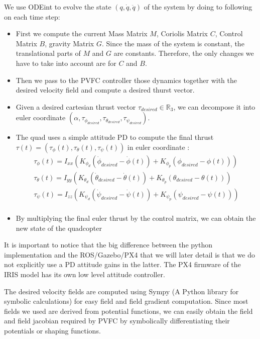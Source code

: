 We use ODEint to evolve the state $(q,\dot{q}, \ddot{q})$ of the system by doing to following on each time step: 
\begin{itemize}
    \item First we compute the current Mass Matrix $M$, Coriolis Matrix $C$, Control Matrix $B$, gravity Matrix $G$. Since the mass of the system is constant, the translational parts of $M$ and $G$ are constants.
    Therefore, the only changes we have to take into account are for $C$ and $B$.
    \item Then we pass to the PVFC controller those dynamics together with the desired velocity field and compute a desired thurst vector.
    \item Given a desired cartesian thrust vector $\tau_{desired} \in \mathbb{R}_3$, we can decompose it into euler coordinate $(\alpha, \tau_{\phi_{desired}}, \tau_{\theta_{desired}}, \tau_{\psi_{desired}})$. 
    \item The quad uses a simple attitude PD to compute the final thrust $\tau(t) = (\tau_{{\phi}}(t), \tau_{{\theta}}(t), \tau_{{\psi}}(t)) $ in euler coordinate :
    \begin{align}
        \tau_{{\phi}}(t) = I_{xx}(K_{\phi_{d}}(\dot{\phi}_{desired} - \dot{\phi}(t))+K_{\phi_{p}}(\phi_{desired} - \phi(t)))\\ \nonumber
        \tau_{{\theta}}(t) = I_{yy}(K_{\theta_{d}}(\dot{\theta}_{desired} - \dot{\theta}(t))+K_{\theta_{p}}(\theta_{desired} - \theta(t)))\\ \nonumber
        \tau_{{\psi}}(t) = I_{zz}(K_{\psi_{d}}(\dot{\psi}_{desired} - \dot{\psi}(t))+K_{\psi_{p}}(\psi_{desired} - \psi(t)))\\ \nonumber
    \end{align}
    \item By multiplying the final euler thrust by the control matrix, we can obtain the new state of the quadcopter
\end{itemize}
It is important to notice that the big difference between the python implementation and the ROS/Gazebo/PX4 that we will later detail is that we do not explicitly use a PD attitude gains in the latter. 
The PX4 firmware of the IRIS model has its own low level attitude controller.


The desired velocity fields are computed using Sympy (A Python library for symbolic calculations) for easy field and field gradient computation. Since most fields we used are derived from potential functions, we can easily obtain the field and field jacobian required by PVFC by symbolically differentiating their potentials or shaping functions.

